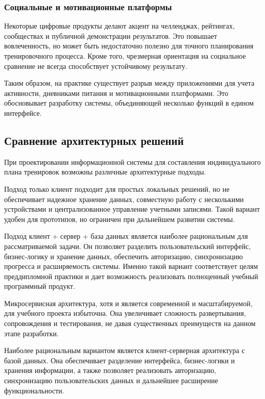 \subsubsection{Социальные и мотивационные платформы}

Некоторые цифровые продукты делают акцент на челленджах, рейтингах, сообществах и публичной демонстрации результатов. Это повышает вовлеченность, но может быть недостаточно полезно для точного планирования тренировочного процесса. Кроме того, чрезмерная ориентация на социальное сравнение не всегда способствует устойчивому результату.

Таким образом, на практике существует разрыв между приложениями для учета активности, дневниками питания и мотивационными платформами. Это обосновывает разработку системы, объединяющей несколько функций в едином интерфейсе.

\subsection{Сравнение архитектурных решений}

При проектировании информационной системы для составления индивидуального плана тренировок возможны различные архитектурные подходы.

Подход только клиент подходит для простых локальных решений, но не обеспечивает надежное хранение данных, совместную работу с несколькими устройствами и централизованное управление учетными записями. Такой вариант удобен для прототипов, но ограничен при дальнейшем развитии системы.

Подход клиент + сервер + база данных является наиболее рациональным для рассматриваемой задачи. Он позволяет разделить пользовательский интерфейс, бизнес-логику и хранение данных, обеспечить авторизацию, синхронизацию прогресса и расширяемость системы. Именно такой вариант соответствует целям преддипломной практики и дает возможность реализовать полноценный учебный программный продукт.

Микросервисная архитектура, хотя и является современной и масштабируемой, для учебного проекта избыточна. Она увеличивает сложность развертывания, сопровождения и тестирования, не давая существенных преимуществ на данном этапе разработки.

Наиболее рациональным вариантом является клиент-серверная архитектура с базой данных. Она обеспечивает разделение интерфейса, бизнес-логики и хранения информации, а также позволяет реализовать авторизацию, синхронизацию пользовательских данных и дальнейшее расширение функциональности.

